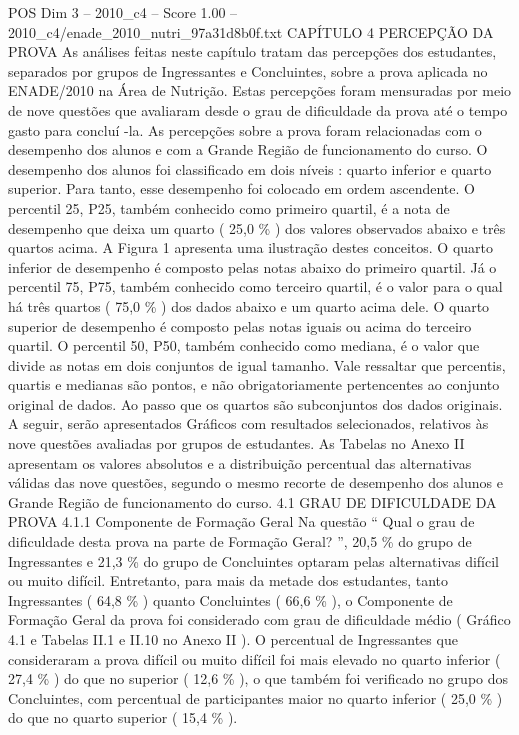 \begin{textsample}{POS Dim 3 – 2010\_c4 – Score 1.00 – 2010\_c4/enade\_2010\_nutri\_97a31d8b0f.txt}  \label{ex:f3_pos_148}
CAPÍTULO 4 PERCEPÇÃO DA PROVA As análises feitas neste capítulo tratam das percepções dos estudantes, separados por grupos de Ingressantes e Concluintes, sobre a prova aplicada no ENADE/2010 na Área de Nutrição.
Estas percepções foram mensuradas por meio de nove questões que avaliaram desde o grau de dificuldade da prova até o tempo gasto para concluí -la.
As percepções sobre a prova foram relacionadas com o desempenho dos alunos e com a Grande Região de funcionamento do curso.
O desempenho dos alunos foi classificado em dois níveis : quarto inferior e quarto superior.
Para tanto, esse desempenho foi colocado em ordem ascendente.
O percentil 25, P25, também conhecido como primeiro quartil, é a nota de desempenho que deixa um quarto ( 25,0 \% ) dos valores observados abaixo e três quartos acima.
A Figura 1 apresenta uma ilustração destes conceitos.
O quarto inferior de desempenho é composto pelas notas abaixo do primeiro quartil.
Já o percentil 75, P75, também conhecido como terceiro quartil, é o valor para o qual há três quartos ( 75,0 \% ) dos dados abaixo e um quarto acima dele.
O quarto superior de desempenho é composto pelas notas iguais ou acima do terceiro quartil.
O percentil 50, P50, também conhecido como mediana, é o valor que divide as notas em dois conjuntos de igual tamanho.
Vale ressaltar que percentis, quartis e medianas são pontos, e não obrigatoriamente pertencentes ao conjunto original de dados.
Ao passo que os quartos são subconjuntos dos dados originais.
A seguir, serão apresentados Gráficos com resultados selecionados, relativos às nove questões avaliadas por grupos de estudantes.
As Tabelas no Anexo II apresentam os valores absolutos e a distribuição percentual das alternativas válidas das nove questões, segundo o mesmo recorte de desempenho dos alunos e Grande Região de funcionamento do curso. 4.1 GRAU DE DIFICULDADE DA PROVA 4.1.1 Componente de Formação Geral Na questão “ Qual o grau de dificuldade desta prova na parte de Formação Geral? ”, 20,5 \% do grupo de Ingressantes e 21,3 \% do grupo de Concluintes optaram pelas alternativas difícil ou muito difícil.
Entretanto, para mais da metade dos estudantes, tanto Ingressantes ( 64,8 \% ) quanto Concluintes ( 66,6 \% ), o Componente de Formação Geral da prova foi considerado com grau de dificuldade médio ( Gráfico 4.1 e Tabelas II.1 e II.10 no Anexo II ).
O percentual de Ingressantes que consideraram a prova difícil ou muito difícil foi mais elevado no quarto inferior ( 27,4 \% ) do que no superior ( 12,6 \% ), o que também foi verificado no grupo dos Concluintes, com percentual de participantes maior no quarto inferior ( 25,0 \% ) do que no quarto superior ( 15,4 \% ).

\end{textsample}
